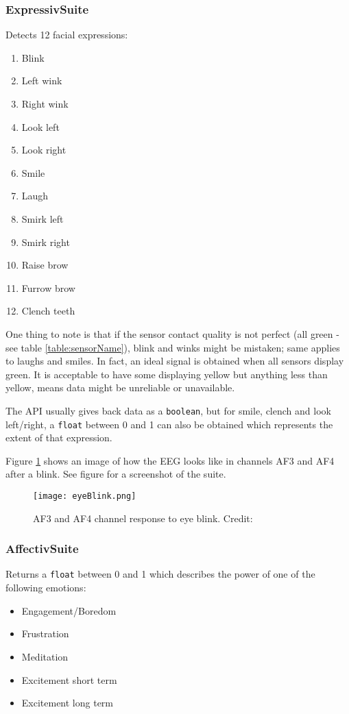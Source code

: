 \subsubsection{Expressiv\texttrademark  Suite}
Detects 12 facial expressions:
\begin{multicols}{2}
\begin{enumerate}
	\item Blink
	\item Left wink
	\item Right wink
	\item Look left
	\item Look right
	\item Smile
	\item Laugh
	\item Smirk left
	\item Smirk right
	\item Raise brow
	\item Furrow brow
	\item Clench teeth
\end{enumerate}
\end{multicols}
One thing to note is that if the sensor contact quality is not perfect (all green - see table \ref{table:sensorName}), blink and winks might be mistaken; same applies to laughs and smiles. In fact, an ideal signal is obtained when all sensors display green. It is acceptable to have some displaying yellow but anything less than yellow, means data might be unreliable or unavailable.
	
The API usually gives back data as a \texttt{boolean}, but for smile, clench and look left/right, a \texttt{float} between 0 and 1 can also be obtained which represents the extent of that expression. 

Figure \ref{fig:blinkAF} shows an image of how the EEG looks like in channels AF3 and AF4 after a blink. See figure for a screenshot of the suite.

\begin{figure}
  \centering
  \texttt{[image: eyeBlink.png]}
  \caption{AF3 and AF4 channel response to eye blink. Credit: \cite{experimenterEPOC}}
    \label{fig:blinkAF}           
\end{figure}

\subsubsection{Affectiv\texttrademark  Suite}
\label{part:affectiv}
Returns a \texttt{float} between 0 and 1 which describes the power of one of the following emotions:
\begin{itemize}
	\item Engagement/Boredom
	\item Frustration
	\item Meditation
	\item Excitement short term
	\item Excitement long term
\end{itemize}

